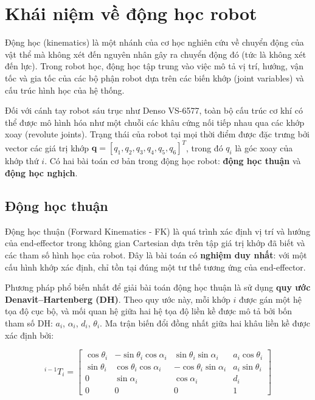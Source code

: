\section{Khái niệm về động học robot}

Động học (kinematics) là một nhánh của cơ học nghiên cứu về chuyển động của vật thể mà không xét đến nguyên nhân gây ra chuyển động đó (tức là không xét đến lực). Trong robot học, động học tập trung vào việc mô tả vị trí, hướng, vận tốc và gia tốc của các bộ phận robot dựa trên các biến khớp (joint variables) và cấu trúc hình học của hệ thống.

Đối với cánh tay robot sáu trục như Denso VS-6577, toàn bộ cấu trúc cơ khí có thể được mô hình hóa như một chuỗi các khâu cứng nối tiếp nhau qua các khớp xoay (revolute joints). Trạng thái của robot tại mọi thời điểm được đặc trưng bởi vector các giá trị khớp $\mathbf{q} = [q_1, q_2, q_3, q_4, q_5, q_6]^T$, trong đó $q_i$ là góc xoay của khớp thứ $i$. Có hai bài toán cơ bản trong động học robot: \textbf{động học thuận} và \textbf{động học nghịch}.

\subsection{Động học thuận}

Động học thuận (Forward Kinematics - FK) là quá trình xác định vị trí và hướng của end-effector trong không gian Cartesian dựa trên tập giá trị khớp đã biết và các tham số hình học của robot. Đây là bài toán có \textbf{nghiệm duy nhất}: với một cấu hình khớp xác định, chỉ tồn tại đúng một tư thế tương ứng của end-effector.

Phương pháp phổ biến nhất để giải bài toán động học thuận là sử dụng \textbf{quy ước Denavit–Hartenberg (DH)}. Theo quy ước này, mỗi khớp $i$ được gán một hệ tọa độ cục bộ, và mối quan hệ giữa hai hệ tọa độ liền kề được mô tả bởi bốn tham số DH: $a_i$, $\alpha_i$, $d_i$, $\theta_i$. Ma trận biến đổi đồng nhất giữa hai khâu liền kề được xác định bởi:

\begin{equation}
^{i-1}T_i = 
\begin{bmatrix}
\cos\theta_i & -\sin\theta_i\cos\alpha_i &  \sin\theta_i\sin\alpha_i & a_i\cos\theta_i \\
\sin\theta_i &  \cos\theta_i\cos\alpha_i & -\cos\theta_i\sin\alpha_i & a_i\sin\theta_i \\
0            &  \sin\alpha_i             &  \cos\alpha_i             & d_i             \\
0            &  0                        &  0                        & 1
\end{bmatrix}
\end{equation}


